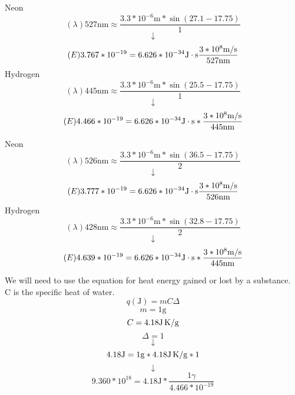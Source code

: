 \documentclass{article}
\begin{document}
    \begin{center}
        Neon
        $$(\lambda) 527 \si{\nano\metre} \approx \dfrac{3.3 * 10^{-6} \si{\metre} * \sin(27.1- 17.75)}{1} $$
        $$\downarrow$$
        $$ (E) 3.767 * 10^{-19} = 6.626 * 10^{-34}\si{\joule} \cdot \si{\second} \dfrac{3 * 10^8 \si[per-mode=symbol]{\metre\per\second}}{527 \si{\nano\metre}} $$
        Hydrogen
        $$(\lambda) 445 \si{\nano\metre} \approx \dfrac{3.3 * 10^{-6} \si{\metre} * \sin(25.5 - 17.75)}{1}$$
        $$\downarrow$$
        $$ (E) 4.466 * 10^{-19} = 6.626 * 10^{-34}\si{\joule} \cdot \si{\second} *  \dfrac{3 * 10^8 \si[per-mode=symbol]{\metre\per\second}}{445 \si{\nano\metre}} $$


        Neon
        $$(\lambda) 526 \si{\nano\metre} \approx \dfrac{3.3 * 10^{-6} \si{\metre} * \sin(36.5 - 17.75)}{2} $$
        $$\downarrow$$
        $$ (E) 3.777 * 10^{-19} = 6.626 * 10^{-34}\si{\joule} \cdot \si{\second} \dfrac{3 * 10^8 \si[per-mode=symbol]{\metre\per\second}}{526 \si{\nano\metre}} $$
        Hydrogen
        $$(\lambda) 428 \si{\nano\metre} \approx \dfrac{3.3 * 10^{-6} \si{\metre} * \sin(32.8 - 17.75)}{2}$$
        $$\downarrow$$
        $$ (E) 4.639 * 10^{-19} = 6.626 * 10^{-34}\si{\joule} \cdot \si{\second} *  \dfrac{3 * 10^8 \si[per-mode=symbol]{\metre\per\second}}{445 \si{\nano\metre}} $$

    \end{center}

    \begin{center}
        We will need to use the equation for heat energy gained or lost by a substance.\\
        C is the specific heat of water.
        $$q(\si{\joule}) = m C \Delta $$
        $$m = 1 \si{\gram}$$
        $$C = 4.18 \si[per-mode=symbol]{\joule\per\gram\kelvin}$$
        $$\Delta = 1$$
        $$\downarrow$$
        $$4.18 \si{\joule} = 1 \si{\gram} * 4.18\si[per-mode=symbol]{\joule\per\gram\kelvin} * 1  $$
        $$\downarrow$$
        $$9.360 * 10^{18} = {4.18 \si{\joule}} * \dfrac{1 \gamma}{4.466 * 10^{-19}}$$

    \end{center}
\end{document}
